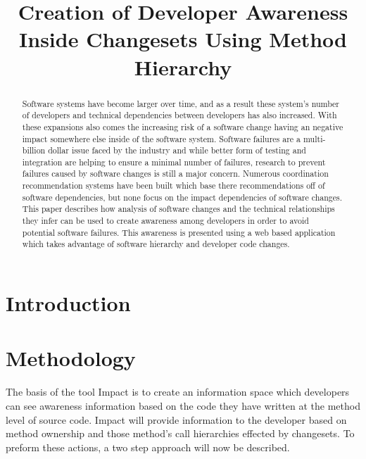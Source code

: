 \documentclass[conference]{IEEEtran}
\begin{document}
\title{Creation of Developer Awareness Inside Changesets Using Method Hierarchy}

\author{
}

\maketitle

\begin{abstract}
Software systems have become larger over time, and as a result these system's number of developers
and technical dependencies between developers has also increased. With these expansions also
comes the increasing risk of a software change having an negative impact somewhere else inside
of the software system. Software failures are a multi-billion dollar issue faced by the industry and
while better form of testing and integration are helping to ensure a minimal number of failures, 
research to prevent failures caused by software changes is still a major concern. Numerous coordination
recommendation systems have been built which base there recommendations off of software dependencies,
but none focus on the impact dependencies of software changes. This paper describes how analysis
of software changes and the technical relationships they infer can be used to create awareness among
developers in order to avoid potential software failures. This awareness is presented using a web based
application which takes advantage of software hierarchy and developer code changes.
\end{abstract}

\section{Introduction}


\section{Methodology}

The basis of the tool Impact is to create an information space which developers can see awareness information
based on the code they have written at the method level of source code. Impact will provide information to the
developer based on method ownership and those method's call hierarchies effected by changesets.  To preform
these actions, a two step approach will now be described. \\
\end{document}
